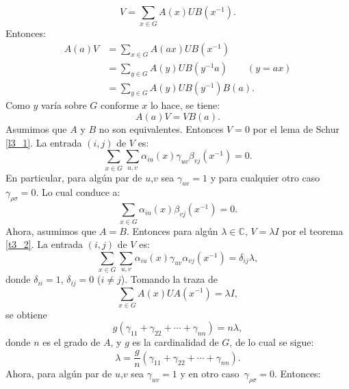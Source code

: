 \documentclass[12pt]{book}
\theoremstyle{definition}
\newcounter{in}
\begin{document}
\begin{equation}
  \label{eq:22}
  V=\sum_{x \in G} A(x)UB(x^{-1}).  
\end{equation}
Entonces:
\begin{equation}
  \label{eq:23}
  \begin{aligned}
    A(a)V &=\sum_{x \in G} A(ax)UB(x^{-1})\\
    &=\sum_{y \in G} A(y)UB(y^{-1}a) \qquad (y=ax)\\
    &=\sum_{y \in G} A(y)UB(y^{-1})B(a).
  \end{aligned}
\end{equation}
Como $y$ varía sobre $G$ conforme $x$ lo hace, se tiene:
\begin{equation}
  \label{eq:24}
  A(a)V=VB(a).
\end{equation} 
Asumimos que $A$ y $B$ no son equivalentes. Entonces $V=0$ por el lema
de Schur \ref{l3_1}. La entrada $(i,j)$ de $V$ es:
\begin{equation}
  \label{eq:25}
  \sum_{x \in G} \sum_{u,v} \alpha_{iu}(x) \gamma_{uv} \beta_{vj}(x^{-1}) = 0.
\end{equation}
En particular, para algún par de $u$,$v$ sea $\gamma_{uv}=1$ y para
cualquier otro caso~$\gamma_{\rho \sigma}=0$. Lo cual conduce a:
\begin{equation}
  \label{eq:26}
  \sum_{x \in G} \alpha_{iu}(x) \beta_{vj}(x^{-1}) = 0.
\end{equation}
Ahora, asumimos que $A=B$. Entonces para algún
$\lambda \in \mathbb{C}$, $V=\lambda I$ por el teorema \ref{t3_2}. La
entrada $(i,j)$ de $V$ es:
\begin{equation}
  \label{eq:27}
   \sum_{x \in G} \sum_{u,v} \alpha_{iu}(x) \gamma_{uv} \alpha_{vj}(x^{-1}) = \delta_{ij}\lambda,
\end{equation}
donde $\delta_{ii}=1$, $\delta_{ij}=0$ ($i \neq j$). Tomando la traza de
\begin{equation}
  \label{eq:28}
  \sum_{x \in G} A(x)UA(x^{-1}) = \lambda I,
\end{equation}
se obtiene
\begin{equation}
  \label{eq:29}
  g(\gamma_{11}+\gamma_{22}+ \cdots +\gamma_{nn})=n \lambda,
\end{equation}
donde $n$ es el grado de $A$, y $g$ es la cardinalidad de $G$, de lo cual se sigue:
\begin{equation}
  \label{eq:30}
  \lambda=\frac{g}{n}(\gamma_{11}+\gamma_{22}+ \cdots + \gamma_{nn}).
\end{equation}
Ahora, para algún par de $u$,$v$ sea $\gamma_{uv}=1$ y en otro caso~$\gamma_{\rho \sigma}=0$. Entonces:
\end{document}
